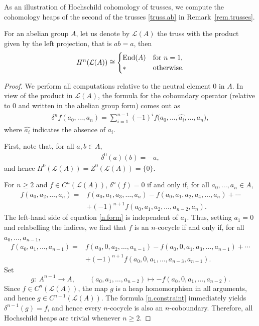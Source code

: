 \documentclass[pdftex]{sigma}
\numberwithin{equation}{section}
\begin{document}
As an illustration of Hochschild cohomology of trusses, we compute the cohomology heaps of the second of the trusses \eqref{truss.ab} in Remark~\ref{rem.trusses}.

\begin{Example}\label{ex.HH.ab}
 For an abelian group $A$, let us denote by $\mathcal{L}(A)$ the truss with the product given by the left projection, that is $ab =a$, then
 \begin{align*}%
 H^n(\mathcal{L}(A)) \cong \begin{cases}
 \operatorname{End}(A) & \mbox{for}\ n=1, \cr
 \ast & \mbox{otherwise}.
 \end{cases}
 \end{align*}
\end{Example}
\begin{proof}
 We perform all computations relative to the neutral element $0$ in $A$. In view of the product in $\mathcal{L}(A)$, the formula for the coboundary operator (relative to $0$ and written in the abelian group form) comes out as
 \begin{gather}\label{dnf}
 \delta^n f(a_0,\dots,a_n) = \sum^{n-1}_{i=1}(-1)^i f \big(a_0,\dots ,\widehat{a_i},\dots,a_n\big),
\end{gather}
where $\widehat{a_i}$ indicates the absence of $a_i$.

First, note that, for all $a,b\in A$,
 \begin{gather}\label{0.cob}
 \delta^0(a)(b) = -a,
 \end{gather}
 and hence $H^0(\mathcal{L}(A))= Z^0(\mathcal{L}(A)) =\{0\}$.

 For $n\geq 2$ and $f\in C^n(\mathcal{L}(A))$, $\delta^n (f) = 0$ if and only if, for all $a_0,\dots, a_n\in A$,
 \begin{align}
 f(a_0,a_2,\dots , a_n)={}& f(a_0,a_1,a_3,\dots, a_n) - f(a_0,a_1,a_2,a_4,\dots, a_n)+\cdots \nonumber\\
 &+ (-1)^{n+1}f(a_0,a_1,a_2,\dots, a_{n-2}, a_n).\label{n.form}
 \end{align}
 The left-hand side of equation \eqref{n.form} is independent of $a_1$. Thus, setting $a_1=0$ and relabelling the indices, we find that $f$ is an $n$-cocycle if and only if, for all $a_0,\dots, a_{n-1}$,
 \begin{align}
 f(a_0,a_1,\dots , a_{n-1}) ={}& f(a_0,0, a_2,\dots, a_{n-1}) - f(a_0,0,a_1,a_3,\dots, a_{n-1})+\cdots\nonumber\\
 & + (-1)^{n+1}f(a_0,0,a_1,\dots, a_{n-3}, a_{n-1}).\label{n.constraint}
 \end{align}
 Set
 \[
 g\colon\ A^{n-1} \to A, \qquad (a_0,a_1,\dots , a_{n-2})\mapsto -f(a_0,0,a_1,\dots , a_{n-2}).
 \]
 Since $f\in C^n(\mathcal{L}(A))$, the map $g$ is a heap homomorphism in all arguments, and hence $g\in C^{n-1}(\mathcal{L}(A))$. The formula \eqref{n.constraint} immediately yields $\delta^{n-1}(g) =f$, and hence every $n$-cocycle is also an $n$-coboundary. Therefore, all Hochschild heaps are trivial whenever $n\geq 2$.


\end{proof}
\end{document}
